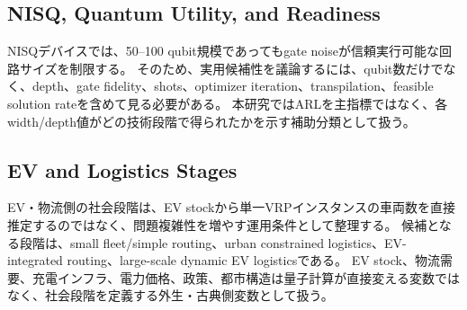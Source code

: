 \subsection{NISQ, Quantum Utility, and Readiness}

NISQデバイスでは、50--100 qubit規模であってもgate noiseが信頼実行可能な回路サイズを制限する。
そのため、実用候補性を議論するには、qubit数だけでなく、depth、gate fidelity、shots、optimizer iteration、transpilation、feasible solution rateを含めて見る必要がある。
本研究ではARLを主指標ではなく、各width/depth値がどの技術段階で得られたかを示す補助分類として扱う。

\subsection{EV and Logistics Stages}

EV・物流側の社会段階は、EV stockから単一VRPインスタンスの車両数を直接推定するのではなく、問題複雑性を増やす運用条件として整理する。
候補となる段階は、small fleet/simple routing、urban constrained logistics、EV-integrated routing、large-scale dynamic EV logisticsである。
EV stock、物流需要、充電インフラ、電力価格、政策、都市構造は量子計算が直接変える変数ではなく、社会段階を定義する外生・古典側変数として扱う。
